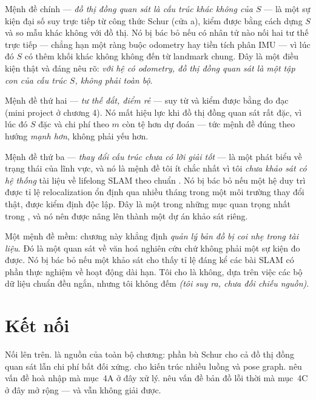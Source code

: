 \documentclass[../../vslam.tex]{subfiles}
\begin{document}
Mệnh đề chính --- \emph{đồ thị đồng quan sát là cấu trúc khác không của \(S\)} --- là một sự kiện đại số suy trực tiếp từ công thức Schur (cửa a), kiểm được bằng cách dựng \(S\) và so mẫu khác không với đồ thị. Nó bị bác bỏ nếu có nhân tử nào nối hai tư thế trực tiếp --- chẳng hạn một ràng buộc odometry hay tiền tích phân IMU --- vì lúc đó \(S\) có thêm khối khác không không đến từ landmark chung. Đây là một điều kiện thật và đáng nêu rõ: \emph{với hệ có odometry, đồ thị đồng quan sát là một \emph{tập con} của cấu trúc \(S\), không phải toàn bộ}.

Mệnh đề thứ hai --- \emph{tư thế đắt, điểm rẻ} --- suy từ  và kiểm được bằng đo đạc (mini project ở chương 4). Nó mất hiệu lực khi đồ thị đồng quan sát rất đặc, vì lúc đó \(S\) đặc và chi phí theo \(m\) còn tệ hơn dự đoán --- tức mệnh đề đúng theo hướng \emph{mạnh hơn}, không phải yếu hơn.

Mệnh đề thứ ba --- \emph{thay đổi cấu trúc chưa có lời giải tốt} --- là một phát biểu về trạng thái của lĩnh vực, và nó là mệnh đề tôi ít chắc nhất vì tôi \emph{chưa khảo sát có hệ thống} tài liệu về lifelong SLAM theo chuẩn . Nó bị bác bỏ nếu một hệ duy trì được tỉ lệ relocalization ổn định qua nhiều tháng trong một môi trường thay đổi thật, được kiểm định độc lập. Đây là một trong những mục quan trọng nhất trong , và nó nên được nâng lên thành một dự án khảo sát riêng.

Một mệnh đề mềm: chương này khẳng định \emph{quản lý bản đồ bị coi nhẹ trong tài liệu}. Đó là một quan sát về văn hoá nghiên cứu chứ không phải một sự kiện đo được. Nó bị bác bỏ nếu một khảo sát cho thấy tỉ lệ đáng kể các bài SLAM có phần thực nghiệm về hoạt động dài hạn. Tôi cho là không, dựa trên việc các bộ dữ liệu chuẩn đều ngắn, nhưng tôi không đếm \emph{(tôi suy ra, chưa đối chiếu nguồn)}.

\section{Kết nối}

Nối lên trên.  là nguồn của toàn bộ chương: phần bù Schur cho cả đồ thị đồng quan sát lẫn chi phí bất đối xứng.  cho kiến trúc nhiều luồng và pose graph.  nêu vấn đề hoà nhập mà mục~4A ở đây xử lý.  nêu vấn đề bản đồ lỗi thời mà mục~4C ở đây mở rộng --- và vẫn không giải được.
\end{document}
